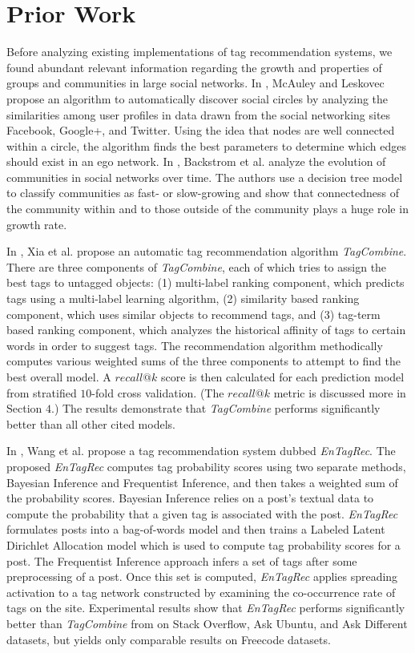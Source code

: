 \documentclass[11pt]{IEEEtran}
\begin{document}
\section{Prior Work}

Before analyzing existing implementations of tag recommendation systems, we found abundant relevant information regarding the growth and properties of groups and communities in large social networks. In \cite{2}, McAuley and Leskovec propose an algorithm to automatically discover social circles by analyzing the similarities among user profiles in data drawn from the social networking sites Facebook, Google+, and Twitter. Using the idea that nodes are well connected within a circle, the algorithm finds the best parameters to determine which edges should exist in an ego network. In \cite{3}, Backstrom et al. analyze the evolution of communities in social networks over time. The authors use a decision tree model to classify communities as fast- or slow-growing and show that connectedness of the community within and to those outside of the community plays a huge role in growth rate.

In \cite{1}, Xia et al. propose an automatic tag recommendation algorithm \textit{TagCombine}. There are three components of \textit{TagCombine}, each of which tries to assign the best tags to untagged objects: (1) multi-label ranking component, which predicts tags using a multi-label learning algorithm, (2) similarity based ranking component, which uses similar objects to recommend tags, and (3) tag-term based ranking component, which analyzes the historical affinity of tags to certain words in order to suggest tags. The recommendation algorithm methodically computes various weighted sums of the three components to attempt to find the best overall model. A $recall@k$ score is then calculated for each prediction model from stratified $10$-fold cross validation. (The $recall@k$ metric is discussed more in Section $4$.) The results demonstrate that \textit{TagCombine} performs significantly better than all other cited models.

In \cite{5}, Wang et al. propose a tag recommendation system dubbed \textit{EnTagRec}. The proposed \textit{EnTagRec} computes tag probability scores using two separate methods, Bayesian Inference and Frequentist Inference, and then takes a weighted sum of the probability scores. Bayesian Inference relies on a post’s textual data to compute the probability that a given tag is associated with the post. \textit{EnTagRec} formulates posts into a bag-of-words model and then trains a Labeled Latent Dirichlet Allocation model which is used to compute tag probability scores for a post. The Frequentist Inference approach infers a set of tags after some preprocessing of a post. Once this set is computed, \textit{EnTagRec} applies spreading activation to a tag network constructed by examining the co-occurrence rate of tags on the site. Experimental results show that \textit{EnTagRec} performs significantly better than \textit{TagCombine} from \cite{1} on Stack Overflow, Ask Ubuntu, and Ask Different datasets, but yields only comparable results on Freecode datasets.
\end{document}
